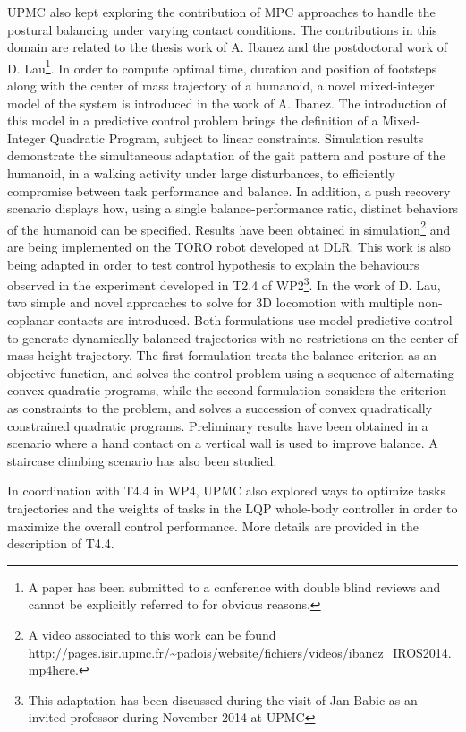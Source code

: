 UPMC also kept exploring the contribution of MPC approaches to  handle the postural balancing under varying contact conditions. The contributions in this domain are related to the thesis work of A. Ibanez \cite{ibanezIROS2014} and the postdoctoral work of D. Lau\footnote{A paper has been submitted to a conference with double blind reviews and cannot be explicitly referred to for obvious reasons.}.  In order to compute optimal time, duration and position of footsteps along with the center of mass trajectory of a humanoid, a novel mixed-integer model of the system is introduced in the work of A. Ibanez. The introduction of this model in a predictive control problem brings the definition of a Mixed-Integer Quadratic Program, subject to linear constraints. Simulation results demonstrate the simultaneous adaptation of the gait pattern and posture of the humanoid, in a walking activity under large disturbances, to efficiently compromise between task performance and balance. In addition, a push recovery scenario displays how, using a single balance-performance ratio, distinct behaviors of the humanoid can be specified. Results have been obtained in simulation\footnote{A video associated to this work can be found \url{http://pages.isir.upmc.fr/~padois/website/fichiers/videos/ibanez\_IROS2014.mp4}{here}.} and are being implemented on the TORO robot developed at DLR. This work is also being adapted in order to test control hypothesis to explain the behaviours observed in the experiment developed in T2.4 of WP2\footnote{This adaptation has been discussed during the visit of Jan Babic as an invited professor during November 2014 at  UPMC}. In the work of D. Lau, two simple and novel approaches to solve for 3D locomotion with multiple non-coplanar contacts are introduced. Both formulations use model predictive control to generate dynamically balanced trajectories with no restrictions on the center of mass height trajectory. The first formulation treats the balance criterion as an objective function, and solves the control problem using a sequence of alternating convex quadratic programs, while the second formulation considers the criterion as constraints to the problem, and solves a succession of convex quadratically constrained quadratic programs. Preliminary results have been obtained in a scenario where a hand contact on a vertical wall is used to improve balance. A staircase climbing scenario has also been studied.

In coordination with T4.4 in WP4, UPMC also explored ways to optimize tasks trajectories \cite{lober-HUMANOIDS2014} and the weights of tasks \cite{lobersubmittedIROS2015} in the LQP whole-body controller in order to maximize the overall control performance. More details are provided in the description of T4.4.\\

